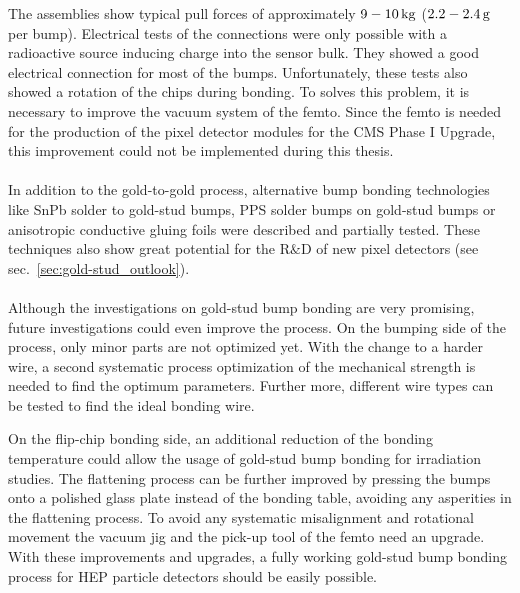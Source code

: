 The assemblies show typical pull forces of approximately $9-10\,\rm{kg}$ ($2.2-2.4\,\rm{g}$ per bump). Electrical tests of the connections were only possible with a radioactive source inducing charge into the sensor bulk. They showed a good electrical connection for most of the bumps. Unfortunately, these tests also showed a rotation of the chips during bonding. To solves this problem, it is necessary to improve the vacuum system of the femto. Since the femto is needed for the production of the pixel detector modules for the CMS Phase I Upgrade, this improvement could not be implemented during this thesis.
\\
\\
In addition to the gold-to-gold process, alternative bump bonding technologies like SnPb solder to gold-stud bumps, \ac{PPS} solder bumps on gold-stud bumps or anisotropic conductive gluing foils were described and partially tested. These techniques also show great potential for the R$\&$D of new pixel detectors (see sec.~\ref{sec:gold-stud_outlook}).
\\
\\Although the investigations on gold-stud bump bonding are very promising, future investigations could even improve the process. On the bumping side of the process, only minor parts are not optimized yet. With the change to a harder wire, a second systematic process optimization of the mechanical strength is needed to find the optimum parameters. Further more, different wire types can be tested to find the ideal bonding wire.

On the flip-chip bonding side, an additional reduction of the bonding temperature could allow the usage of gold-stud bump bonding for irradiation studies. The flattening process can be further improved by pressing the bumps onto a polished glass plate instead of the bonding table, avoiding any asperities in the flattening process. To avoid any systematic misalignment and rotational movement the vacuum jig and the pick-up tool of the femto need an upgrade. With these improvements and upgrades, a fully working gold-stud bump bonding process for \ac{HEP} particle detectors should be easily possible.